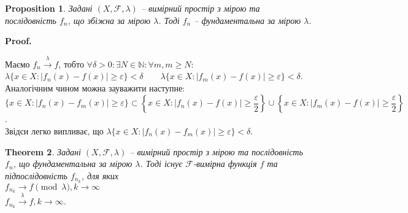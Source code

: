 \documentclass[a4paper, 10pt]{article}
\makeatletter
\theoremstyle{theoremdd}
\newtheorem{theorem}{Theorem}[subsection]
\newtheorem{proposition}[theorem]{Proposition}
\newcommand\tomeasure[1]{\overset{{#1}}{\to}}
\renewenvironment{proof}[1][Proof.\\]{\par
\pushQED{\hfill \qed}%
\normalfont \topsep6\p@\@plus6\p@\relax
\trivlist
\item\relax
{\bfseries
#1\@addpunct{.}}\hspace\labelsep\ignorespaces
}{%
\popQED\endtrivlist\@endpefalse
}
\makeatother
\begin{document}
\begin{proposition}
Задані $(X,\mathcal{F},\lambda)$ -- вимірний простір з мірою та послідовність $f_n$, що збіжна за мірою $\lambda$. Тоді $f_n$ -- фундаментальна за мірою $\lambda$.
\end{proposition}

\begin{proof}
Маємо $f_n \tomeasure{\lambda} f$, тобто $\forall \delta > 0: \exists N \in \mathbb{N}: \forall m,m \geq N:$\\
$\lambda\{x \in X: |f_n(x) - f(x)| \geq \varepsilon\} < \delta \qquad \lambda\{x \in X: |f_m(x) - f(x)| \geq \varepsilon\} < \delta$.\\
Аналогічним чином можна зауважити наступне:\\
$\{x \in X: |f_n(x) - f_m(x)| \geq \varepsilon \} \subset \left\{ x \in X: |f_n(x) - f(x)| \geq \dfrac{\varepsilon}{2} \right\} \cup \left\{ x \in X: |f_m(x) - f(x)| \geq \dfrac{\varepsilon}{2} \right\}$.\\
Звідси легко випливає, що $\lambda\{x \in X: |f_n(x) - f_m(x)| \geq \varepsilon\} < \delta$.
\end{proof}

\begin{theorem}
\label{from_Cauchy_with_measure_implies_convergence}
Задані $(X,\mathcal{F},\lambda)$ -- вимірний простір з мірою та послідовність $f_n$, що фундаментальна за мірою $\lambda$. Тоді існує $\mathcal{F}$-вимірна функція $f$ та підпослідовність $f_{n_k}$, для яких\\
$f_{n_k} \to f \pmod {\lambda}, k \to \infty$\\
$f_{n_k} \tomeasure{\lambda} f, k \to \infty$.
\end{theorem}
\end{document}
